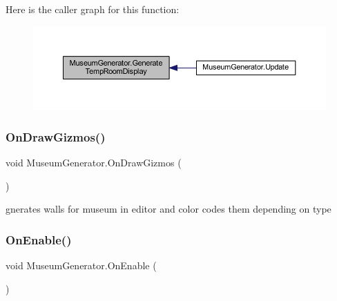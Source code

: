 Here is the caller graph for this function\+:
\nopagebreak
\begin{figure}[H]
\begin{center}
\leavevmode
\includegraphics[width=350pt]{class_museum_generator_a1b9419222535f317005ca9fe1fe757f3_icgraph}
\end{center}
\end{figure}
\mbox{\label{class_museum_generator_a7c219625d39af0857271734995728a10}} 
\subsubsection{\texorpdfstring{On\+Draw\+Gizmos()}{OnDrawGizmos()}}
{\footnotesize\ttfamily void Museum\+Generator.\+On\+Draw\+Gizmos (\begin{DoxyParamCaption}{ }\end{DoxyParamCaption})\hspace{0.3cm}{\ttfamily [private]}}



gnerates walls for museum in editor and color codes them depending on type 

\mbox{\label{class_museum_generator_abc3127d3a23107a350064fc49c5495c1}} 
\subsubsection{\texorpdfstring{On\+Enable()}{OnEnable()}}
{\footnotesize\ttfamily void Museum\+Generator.\+On\+Enable (\begin{DoxyParamCaption}{ }\end{DoxyParamCaption})\hspace{0.3cm}{\ttfamily [private]}}



